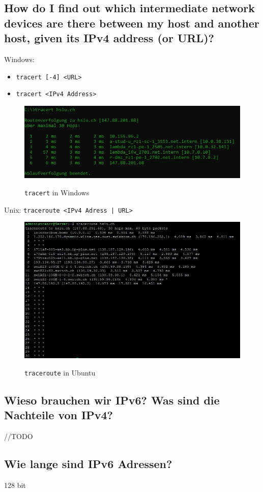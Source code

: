 \subsection*{How do I find out which intermediate network devices are there between my host and another host, given its IPv4 address (or URL)?}
\begin{multicols}{2}
    Windows:
    \begin{itemize}
        \item \texttt{tracert [-4] <URL>}
        \item \texttt{tracert <IPv4 Address>}
    \end{itemize}
    \begin{figure}[H]
        \begin{center}
        \label{pic:tracert}
        \includegraphics[width=.5\textwidth]{images/tracert.jpg}
        \caption{\texttt{tracert} in Windows}
        \end{center}
    \end{figure}
    \columnbreak
    Unix: \texttt{traceroute <IPv4 Adress | URL>}
    \begin{figure}[H]
        \begin{center}
        \label{pic:traceroute}
        \includegraphics[width=.5\textwidth]{images/traceroute.jpg}
        \caption{\texttt{traceroute} in Ubuntu}
        \end{center}
    \end{figure}
\end{multicols}

\subsection*{Wieso brauchen wir IPv6? Was sind die Nachteile von IPv4?}
//TODO
\subsection*{Wie lange sind IPv6 Adressen?}
128 bit
